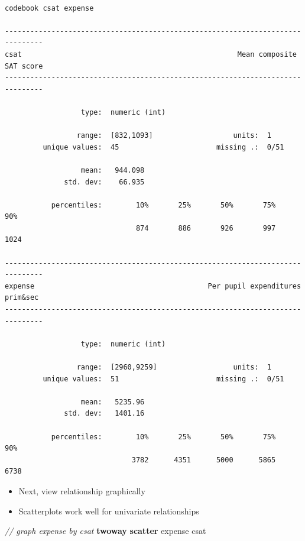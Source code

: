 \documentclass[
]{book}
\newenvironment{Shaded}{\begin{snugshade}}{\end{snugshade}}
\newcommand{\CommentTok}[1]{\textcolor[rgb]{0.56,0.35,0.01}{\textit{#1}}}
\newcommand{\KeywordTok}[1]{\textcolor[rgb]{0.13,0.29,0.53}{\textbf{#1}}}
\newcommand{\NormalTok}[1]{#1}
\providecommand{\tightlist}{%
  \setlength{\itemsep}{0pt}\setlength{\parskip}{0pt}}
\begin{document}
\begin{verbatim}

codebook csat expense

-------------------------------------------------------------------------------
csat                                                   Mean composite SAT score
-------------------------------------------------------------------------------

                  type:  numeric (int)

                 range:  [832,1093]                   units:  1
         unique values:  45                       missing .:  0/51

                  mean:   944.098
              std. dev:    66.935

           percentiles:        10%       25%       50%       75%       90%
                               874       886       926       997      1024

-------------------------------------------------------------------------------
expense                                         Per pupil expenditures prim&sec
-------------------------------------------------------------------------------

                  type:  numeric (int)

                 range:  [2960,9259]                  units:  1
         unique values:  51                       missing .:  0/51

                  mean:   5235.96
              std. dev:   1401.16

           percentiles:        10%       25%       50%       75%       90%
                              3782      4351      5000      5865      6738
\end{verbatim}

\begin{itemize}
\tightlist
\item
  Next, view relationship graphically
\item
  Scatterplots work well for univariate relationships
\end{itemize}

\begin{Shaded}
\begin{Highlighting}[]
  \CommentTok{// graph expense by csat}
  \KeywordTok{twoway} \KeywordTok{scatter}\NormalTok{ expense csat}
\end{Highlighting}
\end{Shaded}
\end{document}

